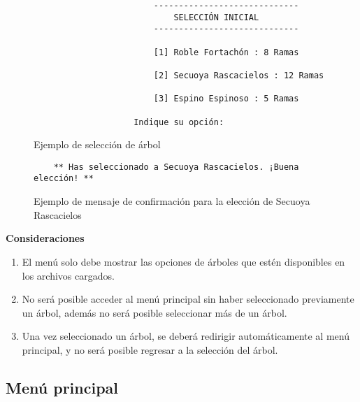 \begin{figure}[H]
    \centering
    
    \begin{verbatim}
                        -----------------------------
                            SELECCIÓN INICIAL
                        -----------------------------
                        
                        [1] Roble Fortachón : 8 Ramas
                    
                        [2] Secuoya Rascacielos : 12 Ramas
                    
                        [3] Espino Espinoso : 5 Ramas
                    
                    Indique su opción: 
    \end{verbatim}
    \caption{Ejemplo de selección de árbol}
    \label{fig:enter-label}
\end{figure}

\begin{figure}[H]
    \centering  
    \begin{verbatim}
    ** Has seleccionado a Secuoya Rascacielos. ¡Buena elección! **      
    \end{verbatim}
    \caption{Ejemplo de mensaje de confirmación para la elección de Secuoya Rascacielos}
    \label{fig:enter-label}
\end{figure}


\textbf{Consideraciones} 

\begin{enumerate}
    \item El menú solo debe mostrar las opciones de árboles que estén disponibles en los archivos cargados.
    \item No será posible acceder al menú principal sin haber seleccionado previamente un árbol, además no será posible seleccionar más de un árbol.
    \item Una vez seleccionado un árbol, se deberá redirigir automáticamente al menú principal, y no será posible regresar a la selección del árbol.
\end{enumerate}
 





\subsection{Menú principal}
\label{subsec:Menú principal}

